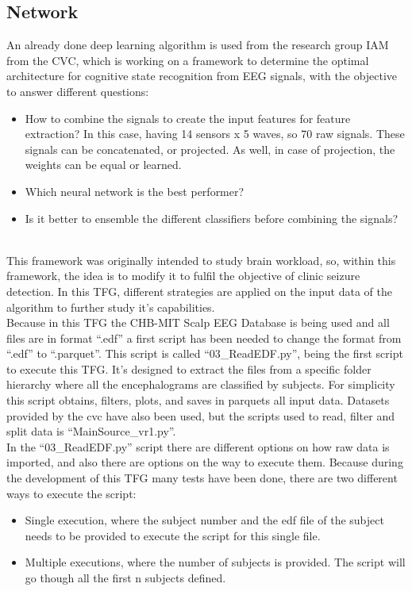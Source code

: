 \subsection{Network}
An already done deep learning algorithm is used from the research group IAM from the CVC, which is working on a framework to determine the optimal architecture for cognitive state recognition from EEG signals, with the objective to answer different questions:
\\
\begin{itemize}
\item How to combine the signals to create the input features for feature extraction? In this case, having 14 sensors x 5 waves, so 70 raw signals. These signals can be concatenated, or projected. As well, in case of projection, the weights can be equal or learned.
\item Which neural network is the best performer?
\item Is it better to ensemble the different classifiers before combining the signals?
\end{itemize}
\leavevmode\\
This framework was originally intended to study brain workload, so, within this framework, the idea is to modify it to fulfil the objective of clinic seizure detection. In this TFG, different strategies are applied on the input data of the algorithm to further study it’s capabilities.
\\
Because in this TFG the CHB-MIT Scalp EEG Database is being used and all files are in format “.edf” a first script has been needed to change the format from “.edf” to “.parquet”. This script is called “03\_ReadEDF.py”, being the first script to execute this TFG. It’s designed to extract the files from a specific folder hierarchy where all the encephalograms are classified by subjects. For simplicity this script obtains, filters, plots, and saves in parquets all input data. Datasets provided by the cvc have also been used, but the scripts used to read, filter and split data is “MainSource\_vr1.py”.
\\
In the “03\_ReadEDF.py” script there are different options on how raw data is imported, and also there are options on the way to execute them. Because during the development of this TFG many tests have been done, there are two different ways to execute the script:
\\
\begin{itemize}
    \item Single execution, where the subject number and the edf file of the subject needs to be provided to execute the script for this single file. 
    \item Multiple executions, where the number of subjects is provided. The script will go though all the first n subjects defined.
\end{itemize}
